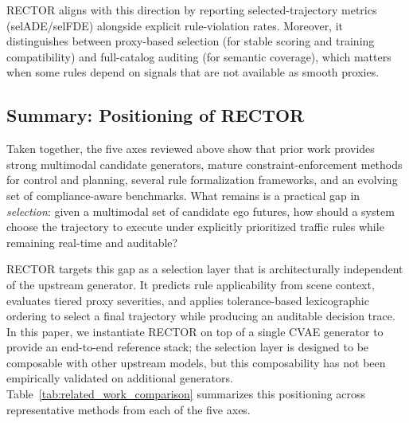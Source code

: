 RECTOR aligns with this direction by reporting selected-trajectory metrics (selADE/selFDE) alongside explicit rule-violation rates.  Moreover, it distinguishes between proxy-based selection (for stable scoring and training compatibility) and full-catalog auditing (for semantic coverage), which matters when some rules depend on signals that are not available as smooth proxies.

\subsection{Summary: Positioning of RECTOR}
\label{subsec:related_work_summary}

Taken together, the five axes reviewed above show that prior work provides strong multimodal candidate generators, mature constraint-enforcement methods for control and planning, several rule formalization frameworks, and an evolving set of compliance-aware benchmarks.  What remains is a practical gap in \emph{selection}: given a multimodal set of candidate ego futures, how should a system choose the trajectory to execute under explicitly prioritized traffic rules while remaining real-time and auditable?

RECTOR targets this gap as a selection layer that is architecturally independent of the upstream generator.  It predicts rule applicability from scene context, evaluates tiered proxy severities, and applies tolerance-based lexicographic ordering to select a final trajectory while producing an auditable decision trace.  In this paper, we instantiate RECTOR on top of a single CVAE generator to provide an end-to-end reference stack; the selection layer is designed to be composable with other upstream models, but this composability has not been empirically validated on additional generators.  Table~\ref{tab:related_work_comparison} summarizes this positioning across representative methods from each of the five axes.

